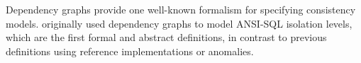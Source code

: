 Dependency graphs \citep{adya} provide one well-known 
formalism for specifying consistency models. 
\citet{adya} originally used dependency graphs to model ANSI-SQL isolation levels,
which are the first formal and abstract definitions,
in contrast to previous definitions using reference implementations or anomalies.

